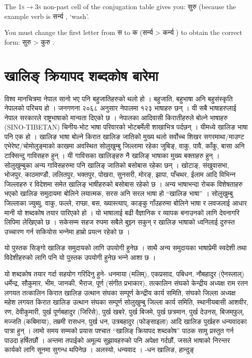The \textsc{1s$\rightarrow$3s} non-past cell of the conjugation table gives you: सुरु  (because the example verb is सर्न्य , `wash'.

You must change the first letter from स  to क  (सर्न्य  > कर्न्य ) to obtain the correct form: सुरु  > कुरु .

\cleardoublepage
\section{खालिङ् क्रियापद शब्दकोष बारेमा}
विश्व मानचित्रमा नेपाल सानो भए पनि बहुजातिहरुको थलो हो । बहुजाति, बहुभाषा अनि बहुसंस्कृति नेपालको परिचय हो । जनगणना २०६८ अनुसार नेपालमा १२३ भाषाहरु छन् । यी सबै भाषाहरुलाई नेपाल सरकारले राष्ट्रभाषाको मान्यता दिएको छ । नेपालका आदिवासी किरातीहरुले बोल्‍ने भाषाहरु (SINO-TIBETAN) चिनीय-भोट भाषा परिवारको भोटबर्मेली शाखाभित्र पर्दछन् । यीमध्ये खालिङ भाषा पनि एक हो । खालिङ भाषा बोल्‍ने किरात खालिङ जातिको मुख्य थलो सर्वोच्‍च शिखर सगरमाथा/माउण्ट एभेरेष्ट/चोमोलुङ्‍माको  काखमा अवस्थित सोलुखुम्बु जिल्‍लामा रहेका जुबिङ्, वाकु, पावै, काँकु, बासा अनि टाक्सिन्दु गा‍‍विसहरु हुन् । यी गाविसका खालिङ्‍हरु नै खालिङ् भाषाका मुख्य बक्ताहरु हुन् । सोलुखुम्बुका अन्य गाविसहरुमा पनि खालिङ् जातिको बसोबास रहेका छन् । खोटाङ्, संखुवासभा, भोजपुर, काठमाण्डौ, ललितपुर, भक्तपुर, पोखरा, सुनसरी, मोरङ्, झापा, पाँचथर, ईलाम आदि विभिन्‍न जिल्‍लाहरु र विदेशमा समेत खालिङ् भाषीहरुको बसोबास रहेको छ । 
अन्य भाषाभन्दा रोचक विशेषताहरु भएको खालिङ समुदायमा बोलिने लयात्मक, सरस अनि सरल भाषा हो “खालिङ भाषा” । सोलुखुम्बु जिल्‍लाका ज्युब्यु, वाकु, फल्‍ले, राप्छा, बस, ख्यास्त्याप्, काङ्‍कु गाँउहरुमा बोलिने भाषा र लवजलाई आधार मानी यो शब्दकोष तयार पारिएको हो । यो भाषालाई बढी वैज्ञानिक र व्यापक बनाउनको लागि देवनागरि लिपिमा लेखिएको छ । सकेसम्म सहज रुपमा सबैले बुझ्‍न सकुन् र खालिङ भाषाको ध्वनिलाई दुरुस्त उच्‍चारण गर्न सकियोस भन्‍नेमा हाम्रो प्रयत्‍न रहेको छ । 

यो पुस्तक सिङ्‍गो खालिङ समुदायको लागि उपयोगी हुनेछ । साथै अन्य समुदायका भाषाप्रेमी स्वदेशी तथा विदेशीहरुको लागि पनि यो पुस्तक उपयोगी हुनेछ भन्‍ने आशा छ । 

यो शब्दकोष तयार गर्दा सहयोग गरिदिनु हुने- धनमाया (मलिम्), एकप्रसाद, पबिधन, नौबहादुर (ऐनस्लाल्) धर्मेन्द्र, सौकुमार, भीम, जानकी, भैराज, पूर्ण (संगीत प्रभाकार), तत्कालिन संघको केन्द्रीय अध्यक्ष राम रतन लगयत तत्कालिन किरात खालिङ उत्थान संघका सम्पूर्ण केन्द्रीय कार्य समिति, संघको जिल्‍ला अध्यक्ष महेश लगयत किरात खालिङ उत्थान संघका सम्पूर्ण सोलुखुम्बु जिल्‍ला कार्य समिति, स्थानीयबासी आशवीर, रण, देवीकुमारी, पुर्ख पूर्णबहादुर (जिरिसे), पुर्ख खबरे, पुर्ख बिजमे, पुर्ख छत्रमान, पुर्ख देउनस्, बिजम्‌फुल्, मज्जति (कबिमाया), तम्रमी रासधन, पुर्ख धन, उत्रबहादुर (फोङ्‍साइला) आदि खालिङ पुर्खहरु धन्यवादका पात्रा हुन् ।
लामो समय सम्मको प्रयास पश्चात “खालिङ् क्रियापद शब्दकोष” पाठक सामु प्रस्तुत गर्न पाउदा हर्षितछौं । अन्तमा तपाईको अमूल्य सुझावहरुको पनि अपेक्षा गर्दछौं, जसले भाषाको निरन्तर कार्यको लागि सूनमा सुगन्ध थपिनेछ ।
अलस्यो, धन्यवाद ।
-धन खालिङ, हान्दुङ् 





